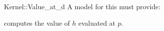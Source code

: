 \begin{ccRefFunctionObjectConcept}{Kernel::Value_at_d}
A model for this must provide:


{computes the value of $h$ evaluated at $p$.}

\end{ccRefFunctionObjectConcept}
